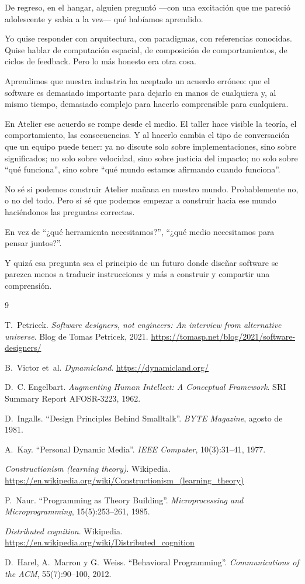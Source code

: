 \documentclass[11pt,a4paper]{article}
\begin{document}
De regreso, en el hangar, alguien preguntó ---con una excitación que me
pareció adolescente y sabia a la vez--- qué habíamos aprendido.

Yo quise responder con arquitectura, con paradigmas, con referencias
conocidas. Quise hablar de computación espacial, de composición de
comportamientos, de ciclos de feedback. Pero lo más honesto era otra cosa.

Aprendimos que nuestra industria ha aceptado un acuerdo erróneo: que el
software es demasiado importante para dejarlo en manos de cualquiera y, al
mismo tiempo, demasiado complejo para hacerlo comprensible para cualquiera.

En Atelier ese acuerdo se rompe desde el medio. El taller hace visible la
teoría, el comportamiento, las consecuencias. Y al hacerlo cambia el tipo de
conversación que un equipo puede tener: ya no discute solo sobre
implementaciones, sino sobre significados; no solo sobre velocidad, sino sobre
justicia del impacto; no solo sobre ``qué funciona'', sino sobre ``qué mundo
estamos afirmando cuando funciona''.

No sé si podemos construir Atelier mañana en nuestro mundo. Probablemente no,
o no del todo. Pero sí sé que podemos empezar a construir hacia ese mundo
haciéndonos las preguntas correctas.

En vez de ``¿qué herramienta necesitamos?'', ``¿qué medio necesitamos para
pensar juntos?''.

Y quizá esa pregunta sea el principio de un futuro donde diseñar software se
parezca menos a traducir instrucciones y más a construir y compartir una
comprensión.

\begin{thebibliography}{9}

T.~Petricek.
\emph{Software designers, not engineers: An interview from alternative
universe}. Blog de Tomas Petricek, 2021.
\url{https://tomasp.net/blog/2021/software-designers/}

B.~Victor et~al.
\emph{Dynamicland}.
\url{https://dynamicland.org/}

D.~C. Engelbart.
\emph{Augmenting Human Intellect: A Conceptual Framework}.
SRI Summary Report AFOSR-3223, 1962.

D.~Ingalls.
``Design Principles Behind Smalltalk''.
\emph{BYTE Magazine}, agosto de 1981.

A.~Kay.
``Personal Dynamic Media''.
\emph{IEEE Computer}, 10(3):31--41, 1977.

\emph{Constructionism (learning theory)}. Wikipedia.
\url{https://en.wikipedia.org/wiki/Constructionism_(learning_theory)}

P.~Naur.
``Programming as Theory Building''.
\emph{Microprocessing and Microprogramming}, 15(5):253--261, 1985.

\emph{Distributed cognition}. Wikipedia.
\url{https://en.wikipedia.org/wiki/Distributed_cognition}

D.~Harel, A.~Marron y G.~Weiss.
``Behavioral Programming''.
\emph{Communications of the ACM}, 55(7):90--100, 2012.

\end{thebibliography}
\end{document}
